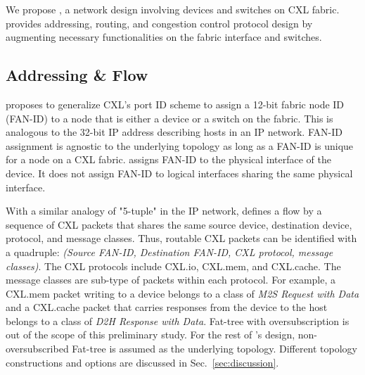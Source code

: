 We propose \aurelia, a network design involving devices and switches on CXL fabric. \aurelia provides addressing, routing, and congestion control protocol design by augmenting necessary functionalities on the fabric interface and switches.

\subsection{Addressing \& Flow}
%
\aurelia proposes to generalize CXL's port ID scheme to assign a 12-bit fabric node ID (FAN-ID) to a node that is either a device or a switch on the fabric. 
%
This is analogous to the 32-bit IP address describing hosts in an IP network.
%
%
FAN-ID assignment is agnostic to the underlying topology as long as a FAN-ID is unique for a node on a CXL fabric. 
%
\aurelia assigns FAN-ID to the physical interface of the device. It does not assign FAN-ID to logical interfaces sharing the same physical interface.
%


With a similar analogy of "5-tuple" in the IP network, \aurelia defines a flow by a sequence of CXL packets that shares the same source device, destination device, protocol, and message classes.
%
Thus, routable CXL packets can be identified with a quadruple: \emph{(Source FAN-ID, Destination FAN-ID, CXL protocol, message classes)}. The CXL protocols include CXL.io, CXL.mem, and CXL.cache. The message classes are sub-type of packets within each protocol. For example, a CXL.mem packet writing to a device belongs to a class of \emph{M2S Request with Data} and a CXL.cache packet that carries responses from the device to the host belongs to a class of \emph{D2H Response with Data}.
%
Fat-tree with oversubscription is out of the scope of this preliminary study. 
%
For the rest of \aurelia's design, non-oversubscribed Fat-tree is assumed as the underlying topology. Different topology constructions and options are discussed in Sec.~\ref{sec:discussion}.
%



